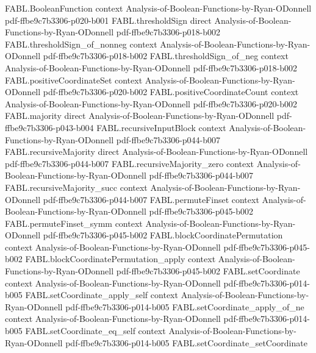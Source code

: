\begin{theorem}
\proofstep
  {FABL.BooleanFunction}
  {context}
  {Analysis-of-Boolean-Functions-by-Ryan-ODonnell}
  {pdf-ffbe9c7b3306-p020-b001}
\proofstep
  {FABL.thresholdSign}
  {direct}
  {Analysis-of-Boolean-Functions-by-Ryan-ODonnell}
  {pdf-ffbe9c7b3306-p018-b002}
\proofstep
  {FABL.thresholdSign_of_nonneg}
  {context}
  {Analysis-of-Boolean-Functions-by-Ryan-ODonnell}
  {pdf-ffbe9c7b3306-p018-b002}
\proofstep
  {FABL.thresholdSign_of_neg}
  {context}
  {Analysis-of-Boolean-Functions-by-Ryan-ODonnell}
  {pdf-ffbe9c7b3306-p018-b002}
\proofstep
  {FABL.positiveCoordinateSet}
  {context}
  {Analysis-of-Boolean-Functions-by-Ryan-ODonnell}
  {pdf-ffbe9c7b3306-p020-b002}
\proofstep
  {FABL.positiveCoordinateCount}
  {context}
  {Analysis-of-Boolean-Functions-by-Ryan-ODonnell}
  {pdf-ffbe9c7b3306-p020-b002}
\proofstep
  {FABL.majority}
  {direct}
  {Analysis-of-Boolean-Functions-by-Ryan-ODonnell}
  {pdf-ffbe9c7b3306-p043-b004}
\proofstep
  {FABL.recursiveInputBlock}
  {context}
  {Analysis-of-Boolean-Functions-by-Ryan-ODonnell}
  {pdf-ffbe9c7b3306-p044-b007}
\proofstep
  {FABL.recursiveMajority}
  {direct}
  {Analysis-of-Boolean-Functions-by-Ryan-ODonnell}
  {pdf-ffbe9c7b3306-p044-b007}
\proofstep
  {FABL.recursiveMajority_zero}
  {context}
  {Analysis-of-Boolean-Functions-by-Ryan-ODonnell}
  {pdf-ffbe9c7b3306-p044-b007}
\proofstep
  {FABL.recursiveMajority_succ}
  {context}
  {Analysis-of-Boolean-Functions-by-Ryan-ODonnell}
  {pdf-ffbe9c7b3306-p044-b007}
\proofstep
  {FABL.permuteFinset}
  {context}
  {Analysis-of-Boolean-Functions-by-Ryan-ODonnell}
  {pdf-ffbe9c7b3306-p045-b002}
\proofstep
  {FABL.permuteFinset_symm}
  {context}
  {Analysis-of-Boolean-Functions-by-Ryan-ODonnell}
  {pdf-ffbe9c7b3306-p045-b002}
\proofstep
  {FABL.blockCoordinatePermutation}
  {context}
  {Analysis-of-Boolean-Functions-by-Ryan-ODonnell}
  {pdf-ffbe9c7b3306-p045-b002}
\proofstep
  {FABL.blockCoordinatePermutation_apply}
  {context}
  {Analysis-of-Boolean-Functions-by-Ryan-ODonnell}
  {pdf-ffbe9c7b3306-p045-b002}
\proofstep
  {FABL.setCoordinate}
  {context}
  {Analysis-of-Boolean-Functions-by-Ryan-ODonnell}
  {pdf-ffbe9c7b3306-p014-b005}
\proofstep
  {FABL.setCoordinate_apply_self}
  {context}
  {Analysis-of-Boolean-Functions-by-Ryan-ODonnell}
  {pdf-ffbe9c7b3306-p014-b005}
\proofstep
  {FABL.setCoordinate_apply_of_ne}
  {context}
  {Analysis-of-Boolean-Functions-by-Ryan-ODonnell}
  {pdf-ffbe9c7b3306-p014-b005}
\proofstep
  {FABL.setCoordinate_eq_self}
  {context}
  {Analysis-of-Boolean-Functions-by-Ryan-ODonnell}
  {pdf-ffbe9c7b3306-p014-b005}
\proofstep
  {FABL.setCoordinate_setCoordinate}

\end{theorem}
